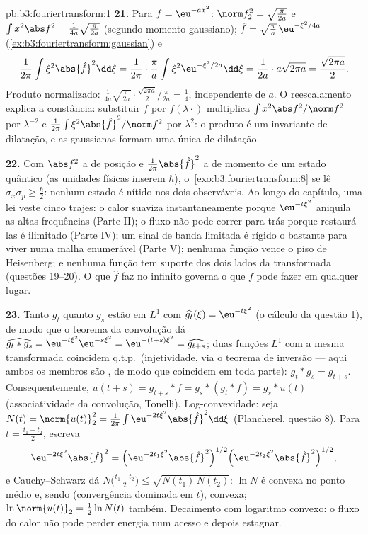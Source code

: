 \begin{solution}{pb:b3:fouriertransform:1}
\textbf{21.} Para $f = \eu^{-ax^2}$: $\norm f_2^2 =
\sqrt{\frac\pi{2a}}$ e $\int x^2\abs f^2 =
\frac1{4a}\sqrt{\frac{\pi}{2a}}$ (segundo momento gaussiano);
$\hat f = \sqrt{\frac\pi a}\,\eu^{-\xi^2/4a}$
(\cref{ex:b3:fouriertransform:gaussian}) e
\[
\frac1{2\pi}\int\xi^2\abs{\hat f}^2\dd\xi =
\frac1{2\pi}\cdot\frac\pi a\int\xi^2
\eu^{-\xi^2/2a}\dd\xi = \frac1{2a}\cdot a\sqrt{2\pi a}
= \frac{\sqrt{2\pi a}}2 .
\]
Produto normalizado: $\frac1{4a}\sqrt{\frac\pi{2a}}\cdot
\frac{\sqrt{2\pi a}}2\big/\frac{\pi}{2a} = \frac14$,
independente de $a$. O reescalamento explica a constância: substituir
$f$ por $f(\lambda\cdot)$ multiplica $\int x^2\abs f^2/\norm
f^2$ por $\lambda^{-2}$ e $\frac1{2\pi}\int\xi^2\abs{\hat
f}^2/\norm f^2$ por $\lambda^{2}$: o produto é um invariante de
dilatação, e as gaussianas formam uma única  de dilatação.

\textbf{22.} Com $\abs f^2$ a  de posição e
$\frac1{2\pi}\abs{\hat f}^2$ a  de momento de um
estado quântico (as unidades físicas inserem $\hbar$),
o~\cref{exo:b3:fouriertransform:8} se lê $\sigma_x\sigma_p
\geq \frac\hbar2$: nenhum estado é nítido nos dois observáveis.
Ao longo do capítulo, uma lei veste cinco trajes: o calor suaviza
instantaneamente porque $\eu^{-t\xi^2}$ aniquila as altas frequências
(Parte II); o fluxo não pode correr para trás porque restaurá-las
é ilimitado (Parte IV); um sinal de banda limitada é rígido
o bastante para viver numa malha enumerável (Parte V); nenhuma função
vence o piso de Heisenberg; e nenhuma função tem suporte
 dos dois lados da transformada (questões 19--20).
O que $\hat f$ faz no infinito governa o que $f$ pode fazer
em qualquer lugar.

\textbf{23.} Tanto $g_t$ quanto $g_s$ estão em $L^1$ com
$\widehat{g_t}(\xi) = \eu^{-t\xi^2}$ (o cálculo da questão 1),
de modo que o teorema da convolução dá
$\widehat{g_t * g_s} = \eu^{-t\xi^2}\eu^{-s\xi^2} =
\eu^{-(t+s)\xi^2} = \widehat{g_{t+s}}$; duas funções $L^1$
com a mesma transformada coincidem q.t.p.\ (injetividade, via o
teorema de inversão --- aqui ambos os membros são , de modo que
coincidem em toda parte): $g_t * g_s = g_{t+s}$. Consequentemente,
$u(t + s) = g_{t+s} * f = g_s * (g_t * f) = g_s * u(t)$
(associatividade da convolução, Tonelli). Log-convexidade: seja
$N(t) = \norm{u(t)}_2^2 = \frac1{2\pi}\int
\eu^{-2t\xi^2}\abs{\hat f}^2\dd\xi$ (Plancherel, questão
8). Para $t = \frac{t_1 + t_2}2$, escreva
\[
\eu^{-2t\xi^2}\abs{\hat f}^2
= \Bigl(\eu^{-2t_1\xi^2}\abs{\hat f}^2\Bigr)^{1/2}
\Bigl(\eu^{-2t_2\xi^2}\abs{\hat f}^2\Bigr)^{1/2},
\]
e Cauchy--Schwarz dá $N\bigl(\frac{t_1+t_2}2\bigr) \leq
\sqrt{N(t_1)\,N(t_2)}$: $\ln N$ é convexa no ponto médio e,
sendo  (convergência dominada em $t$), convexa;
$\ln\norm{u(t)}_2 = \frac12\ln N(t)$ também. Decaimento com logaritmo
convexo: o fluxo do calor não pode perder energia num acesso e
depois estagnar.


\end{solution}
